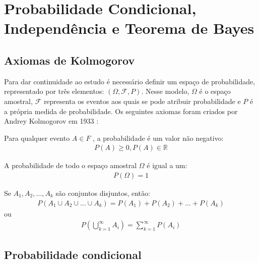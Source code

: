 

\section{Probabilidade Condicional, Independência e Teorema de Bayes}


\subsection{Axiomas de Kolmogorov}


Para dar continuidade ao estudo é necessário definir um espaço de probabilidade, representado por três elementos: $(\Omega, \mathcal{F}, P)$. Nesse modelo, $\Omega$ é o espaço amostral, $\mathcal{F}$ representa os eventos aos quais se pode atribuir probabilidade e $P$ é a própria medida de probabilidade. Os seguintes axiomas foram criados por Andrey Kolmogorov em 1933 \cite{kolmogorov1933grundbegriffe}:


\begin{axioma}
	Para qualquer evento $A \in F$ , a probabilidade é um valor não negativo:
	\begin{align*}
		P(A) \geq 0, P(A) \in \mathbb{R}
	\end{align*}
\end{axioma}

\begin{axioma}
	A probabilidade de todo o espaço amostral $\Omega$  é igual a um:
	\begin{align*}
		P(\Omega) = 1
	\end{align*}
\end{axioma}

\begin{axioma}\label{axioma_3_kolmogorov}
	Se $A_1, A_2, \dots, A_k$ são conjuntos disjuntos, então:
	\begin{align*}
		P(A_1 \cup A_2 \cup \dots \cup A_k) = P(A_1) + P(A_2) + \dots + P(A_k)
	\end{align*}
	ou
	\begin{align*}
		P\left(\bigcup_{k=1}^{\infty} A_i\right) = \sum_{k=1}^{\infty} P(A_i)
	\end{align*}
\end{axioma}




\subsection{Probabilidade condicional}


